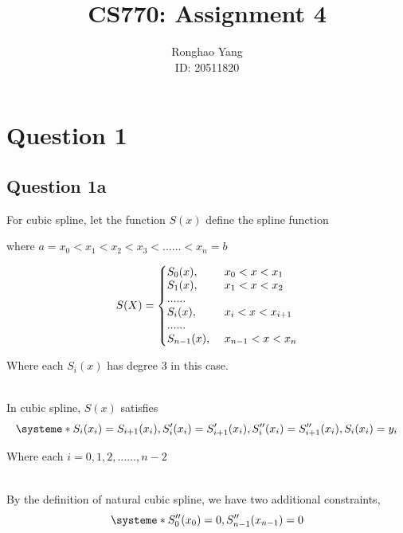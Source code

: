 \documentclass[11pt]{article} %
\title{CS770: Assignment 4}
\author{Ronghao Yang\\ID: 20511820}
\begin{document}
\maketitle

\section{Question 1}
\subsection{Question 1a}
For cubic spline, let the function $S(x)$ define the spline function\\\medskip
\centerline{where $a = x_{0} < x_{1} < x_{2} < x_{3} < ......< x_{n} = b$}
 
\begin{equation}
  S(X)=\left\{
  \begin{array}{@{}ll@{}}
    S_{0}(x), & \text{}\ x_{0}<x<x_{1} \\
    S_{1}(x), & \text{}\ x_{1}<x<x_{2}\\
    ......\\
    S_{i}(x), & \text{} \ x_{i}<x<x_{i+1}\\
    ......\\
    S_{n-1}(x), & \text{}\ x_{n-1}<x<x_{n}
  \end{array}\right.
\end{equation} 
\centerline{Where each $S_{i}(x)$ has degree 3 in this case.}\\
In cubic spline, $S(x)$ satisfies
\[
\systeme*{
S_{i}(x_{i})=S_{i+1}(x_{i}),
S_{i}'(x_{i})=S_{i+1}'(x_{i}), 
S_{i}''(x_{i})=S_{i+1}''(x_{i}),
S_{i}(x_{i}) = y_{i}
}
\]
\centerline{Where each $i = 0, 1, 2, ......, n-2$}\\
By the definition of natural cubic spline, we have two additional constraints,
\[
\systeme*{
S_{0}''(x_{0})=0,
S_{n-1}''(x_{n-1})=0
}
\]
\end{document}

